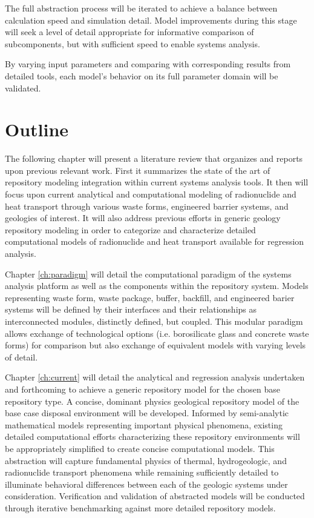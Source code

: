 
The full abstraction process will be iterated to achieve a balance between 
calculation speed and simulation detail. Model improvements during this stage 
will seek a
level of detail appropriate for informative comparison of subcomponents, but 
with sufficient speed to enable systems analysis. 


By varying input parameters and comparing with corresponding results from 
detailed tools, each model's behavior on its full parameter domain will be 
validated.


\section{Outline}


The following chapter will present a literature review that organizes and 
reports upon previous relevant work. First it summarizes the state of the art of 
repository modeling integration within current systems analysis tools. It then 
will focus upon current analytical and computational modeling of radionuclide 
and heat transport through various waste forms, engineered barrier systems, and 
geologies of interest.  It will also address previous efforts in generic geology 
repository modeling in order to categorize and characterize detailed 
computational models of radionuclide and heat transport available for 
regression analysis.


Chapter \ref{ch:paradigm} will detail the computational paradigm of the \Cyclus 
systems analysis platform as well as the components within the repository 
system. Models
representing waste form, waste package, buffer, backfill, and engineered barier 
systems will be defined by their interfaces and their relationships as 
interconnected modules, distinctly defined, but coupled. This modular paradigm 
allows exchange  of technological options (i.e. borosilicate glass and concrete 
waste forms) for comparison but also exchange of equivalent models with varying 
levels of detail.


Chapter \ref{ch:current} will detail the analytical and regression analysis 
undertaken and forthcoming to achieve a generic repository model for the chosen 
base repository type. A concise, dominant physics geological repository model of 
the base case disposal environment will be developed. Informed by semi-analytic 
mathematical models representing important physical phenomena, existing detailed 
computational efforts characterizing these repository environments will be 
appropriately simplified to create concise computational models. This 
abstraction will capture fundamental physics of thermal, hydrogeologic, and 
radionuclide transport phenomena while remaining sufficiently detailed to 
illuminate behavioral differences between each of the geologic systems under 
consideration.  Verification and validation of abstracted models will be 
conducted through iterative benchmarking against more detailed repository 
models.

